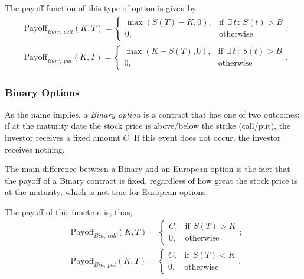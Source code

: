 The payoff function of this type of option is given by
\begin{equation}
\begin{split}
&\text{Payoff}_{Barr,\ call}(K,T)=\begin{cases} 
      \max\left(S(T)-K,0\right), & \mathrm{if}\ \ \exists\,t\,:\,S(t)>B\\
      0, & \mathrm{otherwise}
   \end{cases};\\
&\text{Payoff}_{Barr,\ put}(K,T)=\begin{cases} 
      \max\left(K-S(T),0\right), & \mathrm{if}\ \ \exists\,t\,:\,S(t)>B\\
      0, & \mathrm{otherwise}
   \end{cases}.
\end{split}
\end{equation}



   
   
\subsubsection{Binary Options}
As the name implies, a \emph{Binary option} is a contract that has one of two outcomes: if at the maturity date the stock price is above/below the strike (call/put), the investor receives a fixed amount $C$. If this event does not occur, the investor receives nothing.

The main difference between a Binary and an European option is the fact that the payoff of a Binary contract is fixed, regardless of how great the stock price is at the maturity, which is not true for European options.

The payoff of this function is, thus,
\begin{equation}
\begin{split}
&\text{Payoff}_{Bin,\ call}(K,T)=\begin{cases} 
      C, & \mathrm{if}\ \ S(T)>K\\
      0, & \mathrm{otherwise}
   \end{cases};\\
&\text{Payoff}_{Bin,\ put}(K,T)=\begin{cases} 
      C, & \mathrm{if}\ \ S(T)<K\\
      0, & \mathrm{otherwise}
   \end{cases}.
\end{split}
\end{equation}



